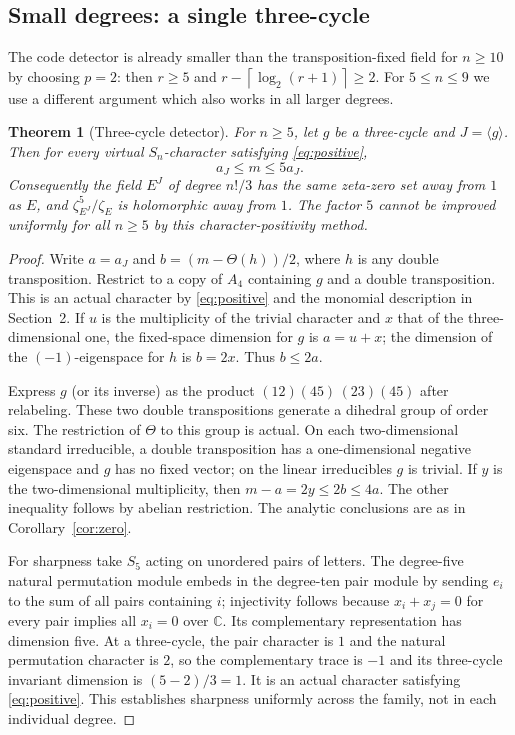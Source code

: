 \documentclass[11pt]{article}
\newtheorem{theorem}{Theorem}[section]
\theoremstyle{remark}\newtheorem{remark}[theorem]{Remark}
\newcommand{\C}{\mathbb C}
\newcommand{\ceil}[1]{\left\lceil #1\right\rceil}
\begin{document}
\subsection{Small degrees: a single three-cycle}
The code detector is already smaller than the transposition-fixed field for $n\ge10$ by choosing $p=2$: then $r\ge5$ and $r-\ceil{\log_2(r+1)}\ge2$. For $5\le n\le9$ we use a different argument which also works in all larger degrees.
\begin{theorem}[Three-cycle detector]\label{thm:three}
For $n\ge5$, let $g$ be a three-cycle and $J=\langle g\rangle$. Then for every virtual $S_n$-character satisfying \eqref{eq:positive},
\[
 a_J\le m\le5a_J.
\]
Consequently the field $E^J$ of degree $n!/3$ has the same zeta-zero set away from $1$ as $E$, and $\zeta_{E^J}^5/\zeta_E$ is holomorphic away from $1$. The factor $5$ cannot be improved uniformly for all $n\ge5$ by this character-positivity method.
\end{theorem}
\begin{proof}
Write $a=a_J$ and $b=(m-\Theta(h))/2$, where $h$ is any double transposition. Restrict to a copy of $A_4$ containing $g$ and a double transposition. This is an actual character by \eqref{eq:positive} and the monomial description in Section~2. If $u$ is the multiplicity of the trivial character and $x$ that of the three-dimensional one, the fixed-space dimension for $g$ is $a=u+x$; the dimension of the $(-1)$-eigenspace for $h$ is $b=2x$. Thus $b\le2a$.

Express $g$ (or its inverse) as the product $(12)(45)\,(23)(45)$ after relabeling. These two double transpositions generate a dihedral group of order six. The restriction of $\Theta$ to this group is actual. On each two-dimensional standard irreducible, a double transposition has a one-dimensional negative eigenspace and $g$ has no fixed vector; on the linear irreducibles $g$ is trivial. If $y$ is the two-dimensional multiplicity, then $m-a=2y\le2b\le4a$. The other inequality follows by abelian restriction. The analytic conclusions are as in Corollary~\ref{cor:zero}.

For sharpness take $S_5$ acting on unordered pairs of letters. The degree-five natural permutation module embeds in the degree-ten pair module by sending $e_i$ to the sum of all pairs containing $i$; injectivity follows because $x_i+x_j=0$ for every pair implies all $x_i=0$ over $\C$. Its complementary representation has dimension five. At a three-cycle, the pair character is $1$ and the natural permutation character is $2$, so the complementary trace is $-1$ and its three-cycle invariant dimension is $(5-2)/3=1$. It is an actual character satisfying \eqref{eq:positive}. This establishes sharpness uniformly across the family, not in each individual degree.
\end{proof}
\end{document}
